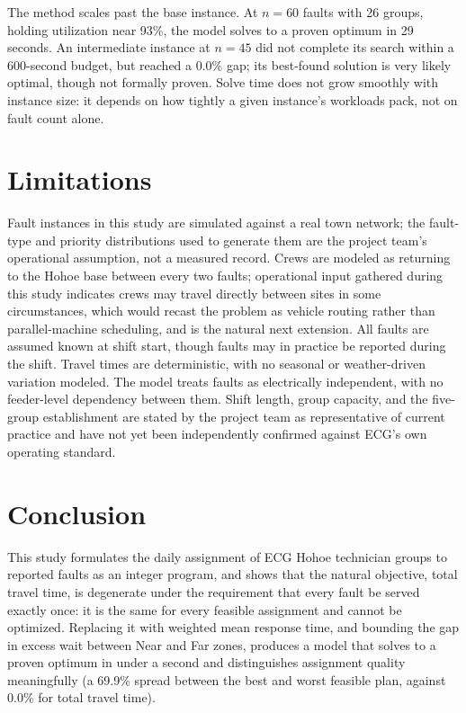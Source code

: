 \documentclass[11pt]{article}
\begin{document}
The method scales past the base instance. At $n=60$ faults with 26 groups, holding utilization near 93\%, the model solves to a proven optimum in 29 seconds. An intermediate instance at $n=45$ did not complete its search within a 600-second budget, but reached a 0.0\% gap; its best-found solution is very likely optimal, though not formally proven. Solve time does not grow smoothly with instance size: it depends on how tightly a given instance's workloads pack, not on fault count alone.

\section*{Limitations}
Fault instances in this study are simulated against a real town network; the fault-type and priority distributions used to generate them are the project team's operational assumption, not a measured record. Crews are modeled as returning to the Hohoe base between every two faults; operational input gathered during this study indicates crews may travel directly between sites in some circumstances, which would recast the problem as vehicle routing rather than parallel-machine scheduling, and is the natural next extension. All faults are assumed known at shift start, though faults may in practice be reported during the shift. Travel times are deterministic, with no seasonal or weather-driven variation modeled. The model treats faults as electrically independent, with no feeder-level dependency between them. Shift length, group capacity, and the five-group establishment are stated by the project team as representative of current practice and have not yet been independently confirmed against ECG's own operating standard.

\section*{Conclusion}
This study formulates the daily assignment of ECG Hohoe technician groups to reported faults as an integer program, and shows that the natural objective, total travel time, is degenerate under the requirement that every fault be served exactly once: it is the same for every feasible assignment and cannot be optimized. Replacing it with weighted mean response time, and bounding the gap in excess wait between Near and Far zones, produces a model that solves to a proven optimum in under a second and distinguishes assignment quality meaningfully (a 69.9\% spread between the best and worst feasible plan, against 0.0\% for total travel time).
\end{document}

